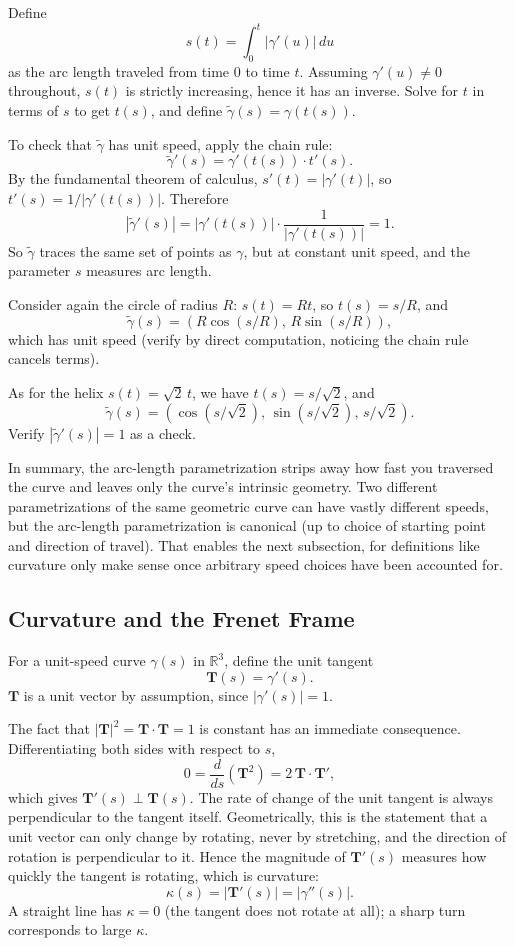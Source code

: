 \documentclass{article}
\begin{document}
Define
$$s(t) = \int_0^t |\gamma'(u)|\, du$$
as the arc length traveled from time $0$ to time $t$. Assuming $\gamma'(u) \neq 0$ throughout, $s(t)$ is strictly increasing, hence it has an inverse. Solve for $t$ in terms of $s$ to get $t(s)$, and define $\tilde{\gamma}(s) = \gamma(t(s))$.

To check that $\tilde{\gamma}$ has unit speed, apply the chain rule:
$$\tilde{\gamma}'(s) = \gamma'(t(s)) \cdot t'(s).$$
By the fundamental theorem of calculus, $s'(t) = |\gamma'(t)|$, so $t'(s) = 1 / |\gamma'(t(s))|$. Therefore
$$|\tilde{\gamma}'(s)| = |\gamma'(t(s))| \cdot \frac{1}{|\gamma'(t(s))|} = 1.$$
So $\tilde{\gamma}$ traces the same set of points as $\gamma$, but at constant unit speed, and the parameter $s$ measures arc length.

Consider again the circle of radius $R$: $s(t) = R t$, so $t(s) = s/R$, and
$$\tilde{\gamma}(s) = (R \cos(s/R),\, R \sin(s/R)),$$
which has unit speed (verify by direct computation, noticing the chain rule cancels terms).

As for the helix $s(t) = \sqrt{2}\, t$, we have $t(s) = s/\sqrt{2}$, and
$$\tilde{\gamma}(s) = (\cos(s/\sqrt{2}),\, \sin(s/\sqrt{2}),\, s/\sqrt{2}).$$
Verify $|\tilde{\gamma}'(s)| = 1$ as a check.

In summary, the arc-length parametrization strips away how fast you traversed the curve and leaves only the curve's intrinsic geometry. Two different parametrizations of the same geometric curve can have vastly different speeds, but the arc-length parametrization is canonical (up to choice of starting point and direction of travel). That enables the next subsection, for definitions like curvature only make sense once arbitrary speed choices have been accounted for.

\subsection{Curvature and the Frenet Frame}

For a unit-speed curve $\gamma(s)$ in $\mathbb{R}^3$, define the unit tangent
$$\mathbf{T}(s) = \gamma'(s).$$
$\mathbf{T}$ is a unit vector by assumption, since $|\gamma'(s)| = 1$.

The fact that $|\mathbf{T}|^2 = \mathbf{T} \cdot \mathbf{T} = 1$ is constant has an immediate consequence. Differentiating both sides with respect to $s$,
$$0 = \frac{d}{ds}(\mathbf{T}^2) = 2\, \mathbf{T} \cdot \mathbf{T}',$$
which gives $\mathbf{T}'(s) \perp \mathbf{T}(s)$. The rate of change of the unit tangent is always perpendicular to the tangent itself. Geometrically, this is the statement that a unit vector can only change by rotating, never by stretching, and the direction of rotation is perpendicular to it. Hence the magnitude of $\mathbf{T}'(s)$ measures how quickly the tangent is rotating, which is curvature:
$$\kappa(s) = |\mathbf{T}'(s)| = |\gamma''(s)|.$$
A straight line has $\kappa = 0$ (the tangent does not rotate at all); a sharp turn corresponds to large $\kappa$.
\end{document}
